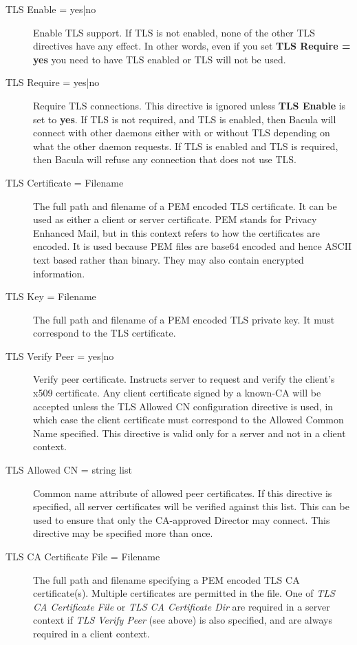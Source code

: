 \begin{description}
\item [TLS Enable = \lt{}yes|no\gt{}]
Enable TLS support.  If TLS is not enabled, none of the other TLS directives
have any effect. In other words, even if you set {\bf TLS Require = yes} 
you need to have TLS enabled or TLS will not be used.

\item [TLS Require = \lt{}yes|no\gt{}]
Require TLS connections.  This directive is ignored unless {\bf TLS Enable}
is set to {\bf yes}.  If TLS is not required, and TLS is enabled, then
Bacula will connect with other daemons either with or without TLS depending
on what the other daemon requests.  If TLS is enabled and TLS is required,
then Bacula will refuse any connection that does not use TLS.

\item [TLS Certificate = \lt{}Filename\gt{}]
The full path and filename of a PEM encoded TLS certificate.  It can be
used as either a client or server certificate.  PEM stands for Privacy
Enhanced Mail, but in this context refers to how the certificates are
encoded.  It is used because PEM files are base64 encoded and hence ASCII
text based rather than binary.  They may also contain encrypted
information.

\item [TLS Key = \lt{}Filename\gt{}]
The full path and filename of a PEM encoded TLS private key.  It must
correspond to the TLS certificate.

\item [TLS Verify Peer = \lt{}yes|no\gt{}]
Verify peer certificate.  Instructs server to request and verify the
client's x509 certificate.  Any client certificate signed by a known-CA
will be accepted unless the TLS Allowed CN configuration directive is used,
in which case the client certificate must correspond to the Allowed
Common Name specified. This directive is valid only for a server
and not in a client context.

\item [TLS Allowed CN = \lt{}string list\gt{}]
Common name attribute of allowed peer certificates.  If this directive is
specified, all server certificates will be verified against this list. This
can be used to ensure that only the CA-approved Director may connect.
This directive may be specified more than once.

\item [TLS CA Certificate File = \lt{}Filename\gt{}]
The full path and filename specifying a
PEM encoded TLS CA certificate(s).  Multiple certificates are
permitted in the file.  One of \emph{TLS CA Certificate File} or \emph{TLS
CA Certificate Dir} are required in a server context if \emph{TLS
Verify Peer} (see above) is also specified, and are always required in a client
context.


\end{description}

